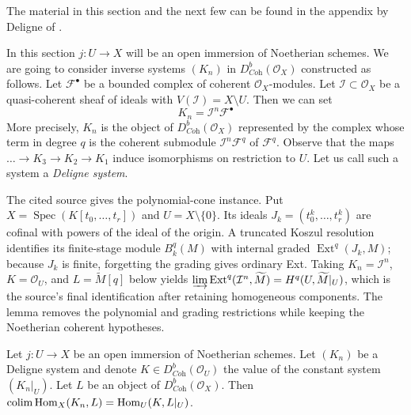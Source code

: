 \noindent
The material in this section and the next few can be found
in the appendix by Deligne of \cite{RD}.

\medskip\noindent
In this section $j : U \to X$ will be an open immersion of Noetherian schemes.
We are going to consider inverse systems $(K_n)$ in
$D^b_{\textit{Coh}}(\mathcal{O}_X)$ constructed as follows.
Let $\mathcal{F}^\bullet$ be a bounded complex of coherent
$\mathcal{O}_X$-modules. Let $\mathcal{I} \subset \mathcal{O}_X$
be a quasi-coherent sheaf of ideals with $V(\mathcal{I}) = X \setminus U$.
Then we can set
$$
K_n = \mathcal{I}^n\mathcal{F}^\bullet
$$
More precisely, $K_n$ is the object of $D^b_{\textit{Coh}}(\mathcal{O}_X)$
represented by the complex whose term in degree $q$
is the coherent submodule $\mathcal{I}^n\mathcal{F}^q$ of $\mathcal{F}^q$.
Observe that the maps $\ldots \to K_3 \to K_2 \to K_1$ induce isomorphisms
on restriction to $U$. Let us call such a system a {\it Deligne system}.

\begin{lemma}
\label{lemma-lift-map}
\begin{reference}
\cite[Chapter III, \S 4, no. 69, Proposition 1, Corollary 2, and
Remark, pp. 262--263]{FAC}
\end{reference}
\begin{history}
The cited source gives the polynomial-cone instance. Put
$X=\operatorname{Spec}(K[t_0,\ldots,t_r])$ and
$U=X\setminus\{0\}$. Its ideals
$J_k=(t_0^k,\ldots,t_r^k)$ are cofinal with powers of the ideal of the
origin. A truncated Koszul resolution identifies its finite-stage module
$B_k^q(M)$ with internal graded $\operatorname{Ext}^q(J_k,M)$; because
$J_k$ is finite, forgetting the grading gives ordinary Ext. Taking
$K_n=\mathcal I^n$, $K=\mathcal O_U$, and
$L=\widetilde M[q]$ below yields
$\varinjlim\operatorname{Ext}^q(\mathcal I^n,\widetilde M)
=H^q(U,\widetilde M|_U)$, which is the source's final identification after
retaining homogeneous components. The lemma removes the polynomial and
grading restrictions while keeping the Noetherian coherent hypotheses.
\end{history}
Let $j : U \to X$ be an open immersion of Noetherian schemes.
Let $(K_n)$ be a Deligne system and denote
$K \in D^b_{\textit{Coh}}(\mathcal{O}_U)$ the value
of the constant system $(K_n|_U)$. Let $L$ be an object of
$D^b_{\textit{Coh}}(\mathcal{O}_X)$.
Then $\mathop{\mathrm{colim}}\nolimits \mathop{\mathrm{Hom}}\nolimits_X(K_n, L) = \mathop{\mathrm{Hom}}\nolimits_U(K, L|_U)$.
\end{lemma}

